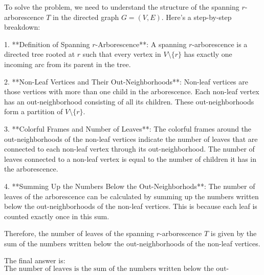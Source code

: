 To solve the problem, we need to understand the structure of the spanning \( r \)-arborescence \( T \) in the directed graph \( G = (V, E) \). Here's a step-by-step breakdown:

1. **Definition of Spanning \( r \)-Arborescence**: A spanning \( r \)-arborescence is a directed tree rooted at \( r \) such that every vertex in \( V \setminus \{r\} \) has exactly one incoming arc from its parent in the tree.

2. **Non-Leaf Vertices and Their Out-Neighborhoods**: Non-leaf vertices are those vertices with more than one child in the arborescence. Each non-leaf vertex has an out-neighborhood consisting of all its children. These out-neighborhoods form a partition of \( V \setminus \{r\} \).

3. **Colorful Frames and Number of Leaves**: The colorful frames around the out-neighborhoods of the non-leaf vertices indicate the number of leaves that are connected to each non-leaf vertex through its out-neighborhood. The number of leaves connected to a non-leaf vertex is equal to the number of children it has in the arborescence.

4. **Summing Up the Numbers Below the Out-Neighborhods**: The number of leaves of the arborescence can be calculated by summing up the numbers written below the out-neighborhoods of the non-leaf vertices. This is because each leaf is counted exactly once in this sum.

Therefore, the number of leaves of the spanning \( r \)-arborescence \( T \) is given by the sum of the numbers written below the out-neighborhoods of the non-leaf vertices.

The final answer is:
\[
\boxed{\text{The number of leaves is the sum of the numbers written below the out-neighborhoods of the non-leaf vertices.}}
\]